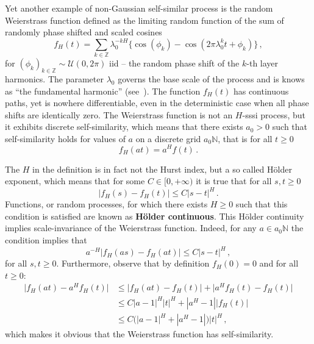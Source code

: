 Yet another example of non-Gaussian self-similar process is the random Weierstrass
function defined as the limiting random function of the sum of randomly phase shifted
and scaled cosines
\[
f_H(t)
= \sum_{k\in \mathbb{Z}} \lambda_0^{-kH}\bigl\{ \cos(\phi_k)
- \cos(2\pi \lambda_0^k t + \phi_k) \bigr\} \,,
\]
for $(\phi_k)_{k\in\mathbb{Z}}\sim \mathcal{U}(0,2\pi)$ iid -- the random phase
shift of the $k$-th layer harmonics. The parameter $\lambda_0$ governs the base
scale of the process and is knows as ``the fundamental harmonic'' (see~\cite{decrouez2013estimation}).
The function $f_H(t)$ has continuous paths, yet is nowhere differentiable, even
in the deterministic case when all phase shifts are identically zero. The Weierstrass
function is not an $H$-sssi process, but it exhibits discrete self-similarity, which
means that there exists $a_0>0$ such that self-similarity holds for values of $a$
on a discrete grid $a_0\mathbb{N}$, that is for all $t\geq 0$
\[ f_H(at) = a^H f(t)\,. \]

The $H$ in the definition is in fact not the Hurst index, but a so called H\"older
exponent, which means that for some $C\in[0,+\infty)$ it is true that for all $s,t\geq0$
\[ \bigl\lvert f_H(s) - f_H(t) \bigr\rvert \leq C |s-t|^H \,. \]
Functions, or random processes, for which there exists $H\geq0$ such that this
condition is satisfied are known as \textbf{H\"older continuous}. This H\"older
continuity implies scale-invariance of the Weierstrass function. Indeed, for any
$a\in a_0\mathbb{N}$ the condition implies that
\[ a^{-H}\bigl\lvert f_H(as) - f_H(at) \bigr\rvert \leq C |s-t|^H\,, \]
for all $s,t\geq 0$. Furthermore, observe that by definition $f_H(0)=0$ and for
all $t\geq0$:
\begin{align*}
	\bigl\lvert f_H(at) - a^H f_H(t) \bigr\rvert
	&\leq \bigl\lvert f_H(at) - f_H(t) \bigr\rvert
	+ \bigl\lvert a^H f_H(t) - f_H(t) \bigr\rvert \\
	&\leq C |a - 1|^H |t|^H + |a^H - 1|\bigl\lvert f_H(t)\bigr\rvert\\
	&\leq C \bigl( |a - 1|^H  + |a^H - 1| \bigr) |t|^H \,,
\end{align*}
which makes it obvious that the Weierstrass function has self-similarity.


